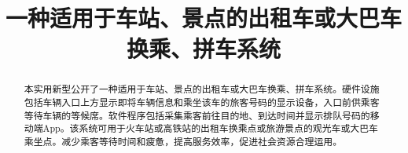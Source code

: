 \setcounter{page}{1}
\title{\textbf{一种适用于车站、景点的出租车或大巴车换乘、拼车系统}}
\renewcommand\abstractname{}
\begin{abstract}
	本实用新型公开了一种适用于车站、景点的出租车或大巴车换乘、拼车系统。硬件设施包括车辆入口上方显示即将车辆信息和乘坐该车的旅客号码的显示设备，入口前供乘客等待车辆的等候席。软件程序包括采集乘客前往目的地、到达时间并显示排队号码的移动端App。该系统可用于火车站或高铁站的出租车换乘点或旅游景点的观光车或大巴车乘坐点。减少乘客等待时间和疲惫，提高服务效率，促进社会资源合理运用。
\end{abstract}
